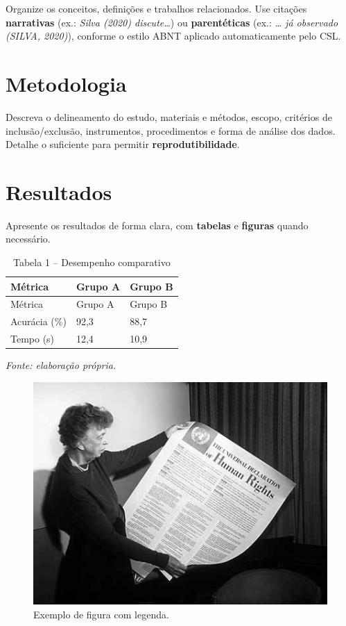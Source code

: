 \documentclass[
  12pt,
  a4paper,
]{scrartcl}
\begin{document}
Organize os conceitos, definições e trabalhos relacionados. Use citações
\textbf{narrativas} (ex.: \emph{Silva (2020) discute\ldots{}}) ou
\textbf{parentéticas} (ex.: \emph{\ldots{} já observado (SILVA, 2020)}),
conforme o estilo ABNT aplicado automaticamente pelo CSL.

\hypertarget{metodologia}{%
\section{Metodologia}\label{metodologia}}

Descreva o delineamento do estudo, materiais e métodos, escopo,
critérios de inclusão/exclusão, instrumentos, procedimentos e forma de
análise dos dados. Detalhe o suficiente para permitir
\textbf{reprodutibilidade}.

\hypertarget{resultados}{%
\section{Resultados}\label{resultados}}

Apresente os resultados de forma clara, com \textbf{tabelas} e
\textbf{figuras} quando necessário.

\begin{longtable}[]{@{}lll@{}}
\caption{Tabela 1 -- Desempenho comparativo}\tabularnewline
\toprule\noalign{}
Métrica & Grupo A & Grupo B \\
\midrule\noalign{}
\endfirsthead
\toprule\noalign{}
Métrica & Grupo A & Grupo B \\
\midrule\noalign{}
\endhead
\bottomrule\noalign{}
\endlastfoot
Acurácia (\%) & 92,3 & 88,7 \\
Tempo (s) & 12,4 & 10,9 \\
\end{longtable}

\emph{Fonte: elaboração própria.}

\begin{figure}
\centering
\includegraphics{images/Eleanor_Roosevelt_and_Human_Rights_Declaration.jpeg}
\caption{Exemplo de figura com legenda.}
\end{figure}
\end{document}
